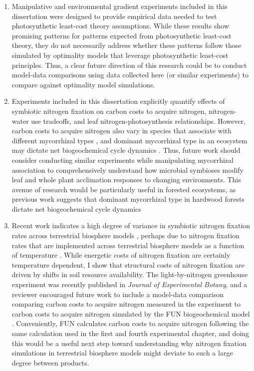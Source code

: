 \begin{enumerate}
    \item Manipulative and environmental gradient experiments included in this dissertation were designed to provide empirical data needed to test photosynthetic least-cost theory assumptions. While these results show promising patterns for patterns expected from photosynthetic least-cost theory, they do not necessarily address whether these patterns follow those simulated by optimality models that leverage photosynthetic least-cost principles. Thus, a clear future direction of this research could be to conduct model-data comparisons using data collected here (or similar experiments) to compare against optimality model simulations.
    
    \item Experiments included in this dissertation explicitly quantify effects of symbiotic nitrogen fixation on carbon costs to acquire nitrogen, nitrogen-water use tradeoffs, and leaf nitrogen-photosynthesis relationships. However, carbon costs to acquire nitrogen also vary in species that associate with different mycorrhizal types , and dominant mycorrhizal type in an ecosystem may dictate net biogeochemical cycle dynamics . Thus, future work should consider conducting similar experiments while manipulating mycorrhizal association to comprehensively understand how microbial symbioses modify leaf and whole plant acclimation responses to changing environments. This avenue of research would be particularly useful in forested ecosystems, as previous work suggests that dominant mycorrhizal type in hardwood forests dictate net biogeochemical cycle dynamics
    
    \item Recent work indicates a high degree of variance in symbiotic nitrogen fixation rates across terrestrial biosphere models , perhaps due to nitrogen fixation rates that are implemented across terrestrial biosphere models as a function of temperature . While energetic costs of nitrogen fixation are certainly temperature dependent, I show that structural costs of nitrogen fixation are driven by shifts in soil resource availability. The light-by-nitrogen greenhouse experiment was recently published in \textit{Journal of Experimental Botany}, and a reviewer encouraged future work to include a model-data comparison comparing carbon costs to acquire nitrogen measured in the experiment to carbon costs to acquire nitrogen simulated by the FUN biogeochemical model . Conveniently, FUN calculates carbon costs to acquire nitrogen following the same calculation used in the first and fourth experimental chapter, and doing this would be a useful next step toward understanding why nitrogen fixation simulations in terrestrial biosphere models might deviate to such a large degree between products.


\end{enumerate}
